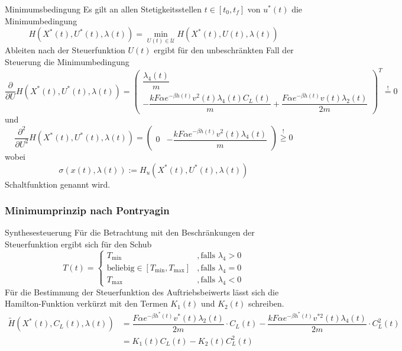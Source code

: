 \documentclass[aspectratio=169]{beamer}
\begin{document}
\begin{frame}
  \begin{block}{Minimumsbedingung}  
  \scriptsize
  Es gilt an allen Stetigkeitsstellen $t \in [t_0,t_f]$ von $u^{\ast}(t)$ die Minimumbedingung \[H(X^{\ast}(t),U^{\ast}(t),\lambda(t)) = \min_{U(t) \in \mathcal{U}} H(X^{\ast}(t),U(t),\lambda(t))\] Ableiten nach der Steuerfunktion $U(t)$ ergibt für den unbeschränkten Fall der Steuerung die Minimumbedingung
    \[\dfrac{\partial}{\partial U} H(X^{\ast}(t),U^{\ast}(t),\lambda(t)) = \begin{pmatrix}
    \dfrac{\lambda_4(t)}{m} \\ 
    - \dfrac{k F \alpha e^{-\beta h(t)} v^2(t) \lambda_4(t) C_L(t)}{m} + \dfrac{F \alpha e^{-\beta h(t)} v(t) \lambda_2(t)}{2m}
    \end{pmatrix}^T \stackrel{!}{=} 0\]
    und 
    \[\dfrac{\partial^2}{\partial U^2} H(X^{\ast}(t),U^{\ast}(t),\lambda(t)) = \begin{pmatrix}
    0 & - \dfrac{k F \alpha e^{-\beta h(t)} v^2(t) \lambda_4(t)}{m} 
    \end{pmatrix} \stackrel{!}{\geq} 0\] wobei \[\sigma(x(t),\lambda(t)) := H_u(X^{\ast}(t),U^{\ast}(t),\lambda(t))\] Schaltfunktion genannt wird. 
  \end{block}
\end{frame}

\begin{frame}
  \frametitle{Minimumprinzip nach Pontryagin}
  \begin{block}{Synthesesteuerung}  
  \scriptsize
  Für die Betrachtung mit den Beschränkungen der Steuerfunktion ergibt sich für den Schub
\[T(t) = \left\lbrace \begin{array}{ll}
T_{\min} & ,\text{falls } \lambda_4 > 0  \\ 
\text{beliebig} \in [T_{\min},T_{\max}] & ,\text{falls } \lambda_4 = 0  \\ 
T_{\max} & ,\text{falls } \lambda_4 < 0
\end{array} \right.\]
Für die Bestimmung der Steuerfunktion des Auftriebsbeiwerts lässt sich die Hamilton-Funktion verkürzt mit den Termen $K_1(t)$ und $K_2(t)$ schreiben.
    \[\begin{split}
        \tilde{H}(X^{\ast}(t),C_L(t),\lambda(t)) &= \dfrac{F \alpha e^{-\beta h^{\ast}(t)} v^{\ast}(t) \lambda_2(t)}{2m} \cdot C_L(t) - \dfrac{k F \alpha e^{-\beta h^{\ast}(t)}  v^{\ast 2}(t) \lambda_4(t)}{2m} \cdot C_L^2(t) \\\
        &= K_1(t) C_L(t) - K_2(t) C_L^2(t)
    \end{split}\]
      \end{block}
\end{frame}
\end{document}
